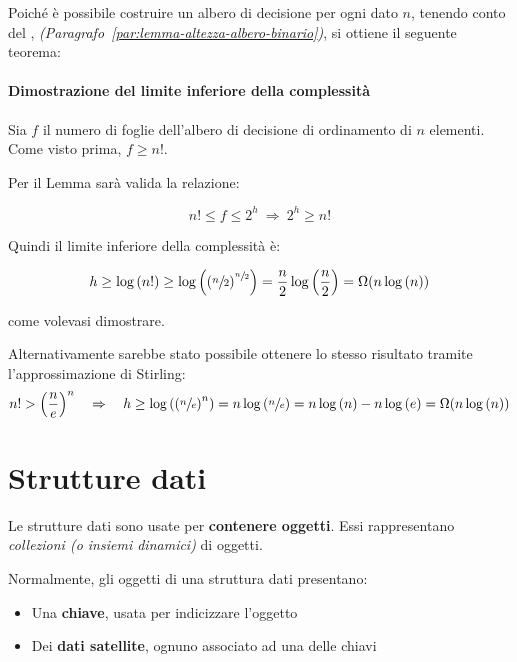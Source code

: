 \documentclass[italian, 10pt]{article}
\begin{document}
Poiché è possibile costruire un albero di decisione per ogni dato \(n\), tenendo conto del , \textit{(Paragrafo~\ref{par:lemma-altezza-albero-binario})}, si ottiene il seguente teorema:


\paragraph{Dimostrazione del limite inferiore della complessità}

Sia \(f\) il numero di foglie dell'albero di decisione di ordinamento di \(n\) elementi.
Come visto prima, \(f \geq n!\).

Per il Lemma sarà valida la relazione:

\[ n! \leq f \leq 2^h \ \Rightarrow \ 2^h \geq n! \]

Quindi il limite inferiore della complessità è:

\[ h \geq \log{(n!)} \geq \log\left(\left(\sfrac{n}{2}\right)^{\sfrac{n}{2}}\right) = \dfrac{n}{2} \log\left(\dfrac{n}{2}\right) = \Omega(n \log{(n)} )\]

come volevasi dimostrare.

\bigskip
Alternativamente sarebbe stato possibile ottenere lo stesso risultato tramite l'approssimazione di Stirling:
\[ n! > \left(\dfrac{n}{e}\right)^n \quad \Rightarrow \quad h \geq \log\left(\left(\sfrac{n}{e}\right)^n\right) = n \log\left(\sfrac{n}{e}\right) = n \log{(n)} - n \log{(e)} = \Omega(n \log{(n)})\]

\clearpage

\section{Strutture dati}

Le strutture dati sono usate per \textbf{contenere oggetti}.
Essi rappresentano \textit{collezioni (o insiemi dinamici)} di oggetti.

Normalmente, gli oggetti di una struttura dati presentano:

\begin{itemize}
  \item Una \textbf{chiave}, usata per indicizzare l'oggetto
  \item Dei \textbf{dati satellite}, ognuno associato ad una delle chiavi
\end{itemize}
\end{document}
